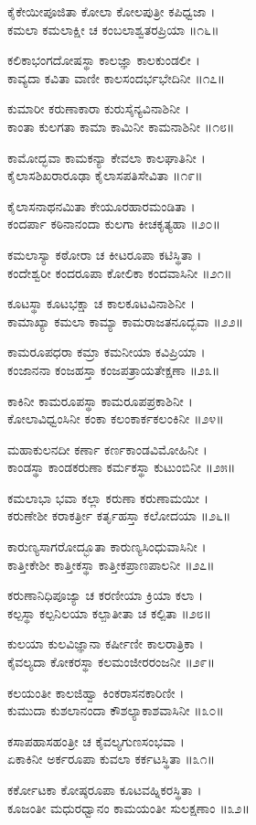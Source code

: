 ಕೈಕೇಯೀಪೂಜಿತಾ ಕೋಲಾ ಕೋಲಪುತ್ರೀ ಕಪಿಧ್ವಜಾ ।\\
ಕಮಲಾ ಕಮಲಾಕ್ಷೀ ಚ ಕಂಬಲಾಶ್ವತರಪ್ರಿಯಾ ॥೧೬॥

ಕಲಿಕಾಭಂಗದೋಷಸ್ಥಾ ಕಾಲಜ್ಞಾ ಕಾಲಕುಂಡಲೀ ।\\
ಕಾವ್ಯದಾ ಕವಿತಾ ವಾಣೀ ಕಾಲಸಂದರ್ಭಭೇದಿನೀ ॥೧೭॥

ಕುಮಾರೀ ಕರುಣಾಕಾರಾ ಕುರುಸೈನ್ಯವಿನಾಶಿನೀ ।\\
ಕಾಂತಾ ಕುಲಗತಾ ಕಾಮಾ ಕಾಮಿನೀ ಕಾಮನಾಶಿನೀ ॥೧೮॥

ಕಾಮೋದ್ಭವಾ ಕಾಮಕನ್ಯಾ ಕೇವಲಾ ಕಾಲಘಾತಿನೀ ।\\
ಕೈಲಾಸಶಿಖರಾರೂಢಾ ಕೈಲಾಸಪತಿಸೇವಿತಾ ॥೧೯॥

ಕೈಲಾಸನಾಥನಮಿತಾ ಕೇಯೂರಹಾರಮಂಡಿತಾ ।\\
ಕಂದರ್ಪಾ ಕಠಿನಾನಂದಾ ಕುಲಗಾ ಕೀಚಕೃತ್ಯಹಾ ॥೨೦॥

ಕಮಲಾಸ್ಯಾ ಕಠೋರಾ ಚ ಕೀಟರೂಪಾ ಕಟಿಸ್ಥಿತಾ ।\\
ಕಂದೇಶ್ವರೀ ಕಂದರೂಪಾ ಕೋಲಿಕಾ ಕಂದವಾಸಿನೀ ॥೨೧॥

ಕೂಟಸ್ಥಾ ಕೂಟಭಕ್ಷಾ ಚ ಕಾಲಕೂಟವಿನಾಶಿನೀ ।\\
ಕಾಮಾಖ್ಯಾ ಕಮಲಾ ಕಾಮ್ಯಾ ಕಾಮರಾಜತನೂದ್ಭವಾ ॥೨೨॥

ಕಾಮರೂಪಧರಾ ಕಮ್ರಾ ಕಮನೀಯಾ ಕವಿಪ್ರಿಯಾ ।\\
ಕಂಜಾನನಾ ಕಂಜಹಸ್ತಾ ಕಂಜಪತ್ರಾಯತೇಕ್ಷಣಾ ॥೨೩॥

ಕಾಕಿನೀ ಕಾಮರೂಪಸ್ಥಾ ಕಾಮರೂಪಪ್ರಕಾಶಿನೀ ।\\
ಕೋಲಾವಿಧ್ವಂಸಿನೀ ಕಂಕಾ ಕಲಂಕಾರ್ಕಕಲಂಕಿನೀ ॥೨೪॥

ಮಹಾಕುಲನದೀ ಕರ್ಣಾ ಕರ್ಣಕಾಂಡವಿಮೋಹಿನೀ ।\\
ಕಾಂಡಸ್ಥಾ ಕಾಂಡಕರುಣಾ ಕರ್ಮಕಸ್ಥಾ ಕುಟುಂಬಿನೀ ॥೨೫॥

ಕಮಲಾಭಾ ಭವಾ ಕಲ್ಲಾ ಕರುಣಾ ಕರುಣಾಮಯೀ ।\\
ಕರುಣೇಶೀ ಕರಾಕರ್ತ್ರೀ ಕರ್ತೃಹಸ್ತಾ ಕಲೋದಯಾ ॥೨೬॥

ಕಾರುಣ್ಯಸಾಗರೋದ್ಭೂತಾ ಕಾರುಣ್ಯಸಿಂಧುವಾಸಿನೀ ।\\
ಕಾತ್ತೀಕೇಶೀ ಕಾತ್ತೀಕಸ್ಥಾ ಕಾತ್ತೀಕಪ್ರಾಣಪಾಲನೀ ॥೨೭॥

ಕರುಣಾನಿಧಿಪೂಜ್ಯಾ ಚ ಕರಣೀಯಾ ಕ್ರಿಯಾ ಕಲಾ ।\\
ಕಲ್ಪಸ್ಥಾ ಕಲ್ಪನಿಲಯಾ ಕಲ್ಪಾತೀತಾ ಚ ಕಲ್ಪಿತಾ ॥೨೮॥

ಕುಲಯಾ ಕುಲವಿಜ್ಞಾನಾ ಕರ್ಷೀಣೀ ಕಾಲರಾತ್ರಿಕಾ ।\\
ಕೈವಲ್ಯದಾ ಕೋಕರಸ್ಥಾ ಕಲಮಂಜೀರರಂಜನೀ ॥೨೯॥

ಕಲಯಂತೀ ಕಾಲಜಿಹ್ವಾ ಕಿಂಕರಾಸನಕಾರಿಣೀ ।\\
ಕುಮುದಾ ಕುಶಲಾನಂದಾ ಕೌಶಲ್ಯಾಕಾಶವಾಸಿನೀ ॥೩೦॥

ಕಸಾಪಹಾಸಹಂತ್ರೀ ಚ ಕೈವಲ್ಯಗುಣಸಂಭವಾ ।\\
ಏಕಾಕಿನೀ ಅರ್ಕರೂಪಾ ಕುವಲಾ ಕರ್ಕಟಸ್ಥಿತಾ ॥೩೧॥

ಕರ್ಕೋಟಕಾ ಕೋಷ್ಠರೂಪಾ ಕೂಟವಹ್ನಿಕರಸ್ಥಿತಾ ।\\
ಕೂಜಂತೀ ಮಧುರಧ್ವಾನಂ ಕಾಮಯಂತೀ ಸುಲಕ್ಷಣಾಂ ॥೩೨॥

